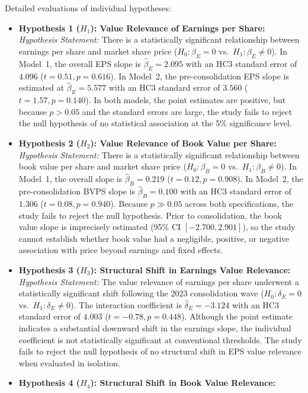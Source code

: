 Detailed evaluations of individual hypotheses:
\begin{itemize}
    \item \textbf{Hypothesis 1 ($H_1$): Value Relevance of Earnings per Share:}
    \textit{Hypothesis Statement:} There is a statistically significant relationship between earnings per share and market share price ($H_0: \beta_E = 0$ vs.\ $H_1: \beta_E \ne 0$).
    In Model~1, the overall EPS slope is $\hat{\beta}_E = 2.095$ with an HC3 standard error of $4.096$ ($t = 0.51, p = 0.616$). In Model~2, the pre-consolidation EPS slope is estimated at $\hat{\beta}_E = 5.577$ with an HC3 standard error of $3.560$ ($t = 1.57, p = 0.140$). In both models, the point estimates are positive, but because $p > 0.05$ and the standard errors are large, the study fails to reject the null hypothesis of no statistical association at the 5\% significance level.
    \item \textbf{Hypothesis 2 ($H_2$): Value Relevance of Book Value per Share:}
    \textit{Hypothesis Statement:} There is a statistically significant relationship between book value per share and market share price ($H_0: \beta_B = 0$ vs.\ $H_1: \beta_B \ne 0$).
    In Model~1, the overall slope is $\hat{\beta}_B = 0.219$ ($t = 0.12, p = 0.908$). In Model~2, the pre-consolidation BVPS slope is $\hat{\beta}_B = 0.100$ with an HC3 standard error of $1.306$ ($t = 0.08, p = 0.940$). Because $p \gg 0.05$ across both specifications, the study fails to reject the null hypothesis. Prior to consolidation, the book value slope is imprecisely estimated (95\% CI $[-2.700, 2.901]$), so the study cannot establish whether book value had a negligible, positive, or negative association with price beyond earnings and fixed effects.
    \item \textbf{Hypothesis 3 ($H_3$): Structural Shift in Earnings Value Relevance:}
    \textit{Hypothesis Statement:} The value relevance of earnings per share underwent a statistically significant shift following the 2023 consolidation wave ($H_0: \delta_E = 0$ vs.\ $H_1: \delta_E \ne 0$).
    The interaction coefficient is $\hat{\delta}_E = -3.124$ with an HC3 standard error of $4.003$ ($t = -0.78, p = 0.448$). Although the point estimate indicates a substantial downward shift in the earnings slope, the individual coefficient is not statistically significant at conventional thresholds. The study fails to reject the null hypothesis of no structural shift in EPS value relevance when evaluated in isolation.
    \item \textbf{Hypothesis 4 ($H_4$): Structural Shift in Book Value Relevance:}

\end{itemize}
